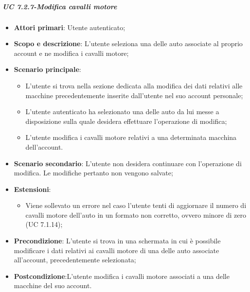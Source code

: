             
            \subparagraph{UC 7.2.7-Modifica cavalli motore}
            \begin{itemize}
                \item \textbf{Attori primari}: Utente autenticato;
              
                \item \textbf{Scopo e descrizione}: L'utente seleziona una delle auto associate al proprio account e ne modifica i cavalli motore; 
                \item \textbf{Scenario principale}:
                    \begin{itemize}
                        \item L'utente si trova nella sezione dedicata alla modifica dei dati relativi alle macchine precedentemente inserite dall'utente nel suo account personale;
                        \item L'utente autenticato ha selezionato una delle auto da lui messe a disposizione sulla quale desidera effettuare l'operazione di modifica;
                        \item L'utente modifica i cavalli motore relativi a una determinata macchina dell'account.
                    \end{itemize}
                \item \textbf{Scenario secondario}: L'utente non desidera continuare con l'operazione di modifica. Le modifiche pertanto non vengono salvate;
                \item \textbf{Estensioni}:
                    \begin{itemize}
                        \item Viene sollevato un errore nel caso l'utente tenti di aggiornare il numero di cavalli motore dell'auto in un formato non corretto, ovvero minore di zero (UC 7.1.14); 
                    \end{itemize}
                \item \textbf{Precondizione}: L'utente si trova in una schermata in cui è possibile modificare i dati relativi ai cavalli motore di una delle auto associate all'account, precedentemente selezionata;
                \item \textbf{Postcondizione}:L'utente modifica i cavalli motore associati a una delle macchine del suo account.
            \end{itemize}
            
            
            
